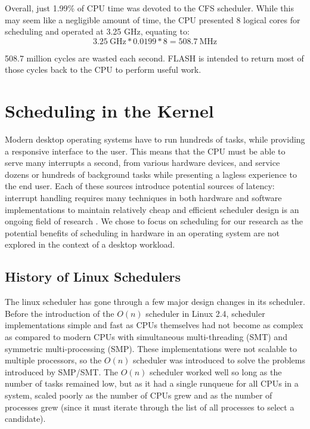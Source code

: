 \documentclass{sig-alternate-10pt}
\begin{document}
Overall, just 1.99\% of CPU time was devoted to the CFS scheduler. While this may seem like a negligible amount of time, the CPU presented 8 logical cores for scheduling and operated at 3.25 GHz, equating to:
\begin{equation*}
	3.25\ \text{GHz}*0.0199*8 = 508.7\ \text{MHz}
\end{equation*}

508.7 million cycles are wasted each second. FLASH is intended to return most of those cycles back to the CPU to perform useful work.

\section{Scheduling in the Kernel}
\label{sec:sched_in_kernel}
Modern desktop operating systems have to run hundreds of tasks, while providing a responsive interface to the user. This means that the CPU must be able to serve many interrupts a second, from various hardware devices, and service dozens or hundreds of background tasks while presenting a lagless experience to the end user. Each of these sources introduce potential sources of latency: interrupt handling \cite{regehr2007safe} requires many techniques in both hardware and software implementations to maintain relatively cheap and efficient scheduler design is an ongoing field of research \cite{wong2008cfs} \cite{park2008hardware} \cite{morton2004hardware}. We chose to focus on scheduling for our research as the potential benefits of scheduling in hardware in an operating system are not explored in the context of a desktop workload.

\subsection{History of Linux Schedulers}
The linux scheduler has gone through a few major design changes in its scheduler. Before the introduction of the $ O(n) $ scheduler in Linux 2.4, scheduler implementations simple and fast as CPUs themselves had not become as complex as compared to modern CPUs with simultaneous multi-threading (SMT) and symmetric multi-processing (SMP). These implementations were not scalable to multiple processors, so the $ O(n) $ scheduler was introduced to solve the problems introduced by SMP/SMT. The $ O(n) $ scheduler worked well so long as the number of tasks remained low, but as it had a single runqueue for all CPUs in a system, scaled poorly as the number of CPUs grew and as the number of processes grew (since it must iterate through the list of all processes to select a candidate).
\end{document}
